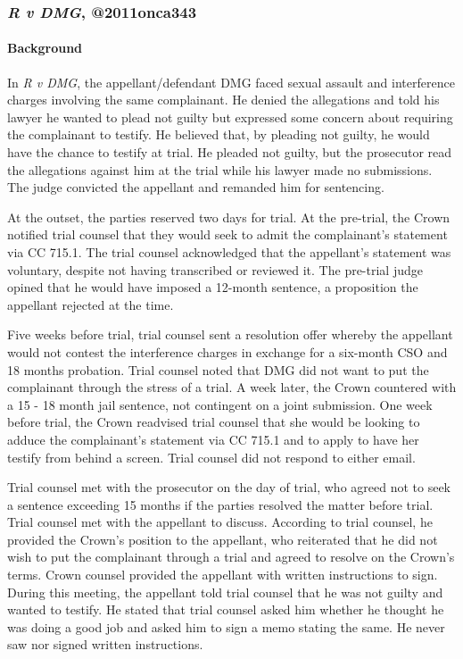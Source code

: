 \subsubsection{\textit{R v DMG}, @2011onca343}

\paragraph{Background\\}

In \textit{R v DMG}, the appellant/defendant DMG faced sexual assault and interference charges involving the same complainant. He denied the allegations and told his lawyer he wanted to plead not guilty but expressed some concern about requiring the complainant to testify. He believed that, by pleading not guilty, he would have the chance to testify at trial. He pleaded not guilty, but the prosecutor read the allegations against him at the trial while his lawyer made no submissions. The judge convicted the appellant and remanded him for sentencing.

At the outset, the parties reserved two days for trial. At the pre-trial, the Crown notified trial counsel that they would seek to admit the complainant's statement via CC 715.1. The trial counsel acknowledged that the appellant's statement was voluntary, despite not having transcribed or reviewed it. The pre-trial judge opined that he would have imposed a 12-month sentence, a proposition the appellant rejected at the time.

Five weeks before trial, trial counsel sent a resolution offer whereby the appellant would not contest the interference charges in exchange for a six-month CSO and 18 months probation. Trial counsel noted that DMG did not want to put the complainant through the stress of a trial. A week later, the Crown countered with a 15 - 18 month jail sentence, not contingent on a joint submission. One week before trial, the Crown readvised trial counsel that she would be looking to adduce the complainant's statement via CC 715.1 and to apply to have her testify from behind a screen. Trial counsel did not respond to either email.

Trial counsel met with the prosecutor on the day of trial, who agreed not to seek a sentence exceeding 15 months if the parties resolved the matter before trial. Trial counsel met with the appellant to discuss. According to trial counsel, he provided the Crown's position to the appellant, who reiterated that he did not wish to put the complainant through a trial and agreed to resolve on the Crown's terms. Crown counsel provided the appellant with written instructions to sign. During this meeting, the appellant told trial counsel that he was not guilty and wanted to testify. He stated that trial counsel asked him whether he thought he was doing a good job and asked him to sign a memo stating the same. He never saw nor signed written instructions.

